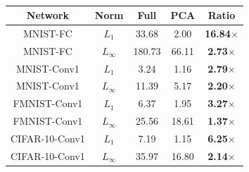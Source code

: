 	\begin{table}[b!]
	\centering
	\begin{tabular}{|c|c||c|c||c|}\hline
		Network & Norm & Full& PCA &  Ratio \\\hline \hline 
		MNIST-FC  & $L_1$ & 33.68 & 2.00  & {\bf 16.84$\times$}\\\hline
		MNIST-FC  & $L_\infty$ & 180.73 & 66.11 & {\bf 2.73$\times$} \\\hline\hline
		
		MNIST-Conv1  & $L_1$ & 3.24 & 1.16 & {\bf 2.79$\times$}\\\hline
		MNIST-Conv1  & $L_\infty$ & 11.39 & 5.17 & {\bf 2.20$\times$}\\\hline\hline
	
		
		FMNIST-Conv1  & $L_1$ & 6.37& 1.95   & {\bf 3.27$\times$}\\\hline
		FMNIST-Conv1 & $L_\infty$ & 25.56& 18.61   & {\bf 1.37$\times$} \\\hline\hline
		
		CIFAR-10-Conv1  & $L_1$ &7.19 & 1.15 &  {\bf 6.25$\times$} \\\hline
		CIFAR-10-Conv1  & $L_\infty$ & 35.97 & 16.80   & {\bf 2.14$\times$} \\\hline\hline

	\end{tabular}
	\caption{
	}
\end{table}
